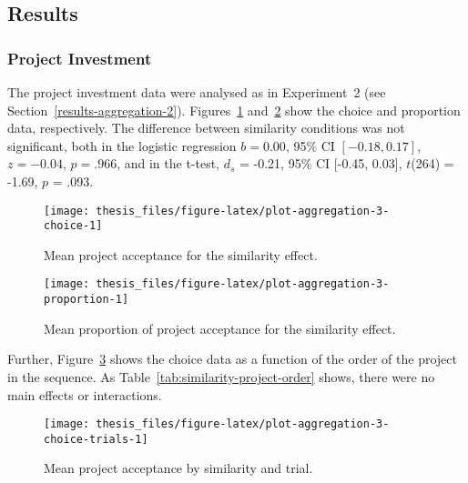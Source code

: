 \documentclass[a4paper, nobind]{templates/ociamthesis}
\theoremstyle{definition}
\theoremstyle{definition}
\theoremstyle{definition}
\theoremstyle{definition}
\theoremstyle{remark}
\begin{document}
\subsection{Results}

\subsubsection{Project Investment}

The project investment data were analysed as in Experiment~2 (see
Section~\ref{results-aggregation-2}).
Figures~\ref{fig:plot-aggregation-3-choice}
and~\ref{fig:plot-aggregation-3-proportion} show the choice and proportion
data, respectively. The difference between similarity conditions was not
significant, both in the logistic regression
\(b = 0.00\), 95\% CI \([-0.18, 0.17]\), \(z = -0.04\), \(p = .966\), and in the t-test,
\(d_s\) = -0.21, 95\% CI {[}-0.45, 0.03{]}, \(t\)(264) = -1.69, \(p\) = .093.



\begin{figure}
\texttt{[image: thesis\_files/figure-latex/plot-aggregation-3-choice-1]} \caption{Mean project acceptance for the similarity effect.}\label{fig:plot-aggregation-3-choice}
\end{figure}



\begin{figure}
\texttt{[image: thesis\_files/figure-latex/plot-aggregation-3-proportion-1]} \caption{Mean proportion of project acceptance for the similarity effect.}\label{fig:plot-aggregation-3-proportion}
\end{figure}

Further, Figure~\ref{fig:plot-aggregation-3-choice-trials} shows the choice
data as a function of the order of the project in the sequence. As
Table~\ref{tab:similarity-project-order} shows, there were no main effects or
interactions.



\begin{figure}
\texttt{[image: thesis\_files/figure-latex/plot-aggregation-3-choice-trials-1]} \caption{Mean project acceptance by similarity and trial.}\label{fig:plot-aggregation-3-choice-trials}
\end{figure}
\end{document}
